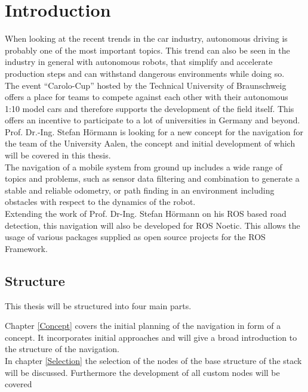 \chapter{Introduction}
\label{introduction}

When looking at the recent trends in the car industry, autonomous driving is probably one of the most important topics. This trend can also be seen in the industry in general with autonomous robots, that simplify and accelerate production steps and can withstand dangerous environments while doing so.\\

The event ``Carolo-Cup'' hosted by the Technical University of Braunschweig offers a place for teams to compete against each other with their autonomous 1:10 model cars and therefore supports the development of the field itself. This offers an incentive to participate to a lot of universities in Germany and beyond.\\

Prof. Dr.-Ing. Stefan Hörmann is looking for a new concept for the navigation for the team of the University Aalen, the concept and initial development of which will be covered in this thesis.\\

The navigation of a mobile system from ground up includes a wide range of topics and problems, such as sensor data filtering and combination to generate a stable and reliable odometry, or path finding in an environment including obstacles with respect to the dynamics of the robot.\\

Extending the work of Prof. Dr-Ing. Stefan Hörmann on his ROS based road detection, this navigation will also be developed for ROS Noetic. This allows the usage of various packages supplied as open source projects for the ROS Framework.

\section{Structure}

This thesis will be structured into four main parts.

Chapter \ref{Concept} covers the initial planning of the navigation in form of a concept. It incorporates initial approaches and will give a broad introduction to the structure of the navigation.\\

In chapter \ref{Selection} the selection of the nodes of the base structure of the stack will be discussed. Furthermore the development of all custom nodes will be covered

